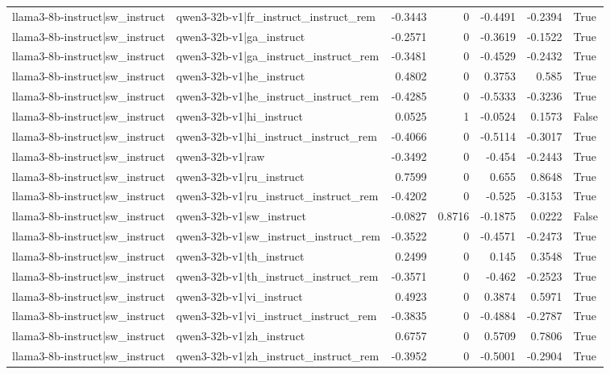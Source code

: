 \begin{table}
\begin{tabular}{l l r r r r l}
llama3-8b-instruct|sw_instruct & qwen3-32b-v1|fr_instruct_instruct_rem & -0.3443 & 0 & -0.4491 & -0.2394 & True \\
llama3-8b-instruct|sw_instruct & qwen3-32b-v1|ga_instruct & -0.2571 & 0 & -0.3619 & -0.1522 & True \\
llama3-8b-instruct|sw_instruct & qwen3-32b-v1|ga_instruct_instruct_rem & -0.3481 & 0 & -0.4529 & -0.2432 & True \\
llama3-8b-instruct|sw_instruct & qwen3-32b-v1|he_instruct & 0.4802 & 0 & 0.3753 & 0.585 & True \\
llama3-8b-instruct|sw_instruct & qwen3-32b-v1|he_instruct_instruct_rem & -0.4285 & 0 & -0.5333 & -0.3236 & True \\
llama3-8b-instruct|sw_instruct & qwen3-32b-v1|hi_instruct & 0.0525 & 1 & -0.0524 & 0.1573 & False \\
llama3-8b-instruct|sw_instruct & qwen3-32b-v1|hi_instruct_instruct_rem & -0.4066 & 0 & -0.5114 & -0.3017 & True \\
llama3-8b-instruct|sw_instruct & qwen3-32b-v1|raw & -0.3492 & 0 & -0.454 & -0.2443 & True \\
llama3-8b-instruct|sw_instruct & qwen3-32b-v1|ru_instruct & 0.7599 & 0 & 0.655 & 0.8648 & True \\
llama3-8b-instruct|sw_instruct & qwen3-32b-v1|ru_instruct_instruct_rem & -0.4202 & 0 & -0.525 & -0.3153 & True \\
llama3-8b-instruct|sw_instruct & qwen3-32b-v1|sw_instruct & -0.0827 & 0.8716 & -0.1875 & 0.0222 & False \\
llama3-8b-instruct|sw_instruct & qwen3-32b-v1|sw_instruct_instruct_rem & -0.3522 & 0 & -0.4571 & -0.2473 & True \\
llama3-8b-instruct|sw_instruct & qwen3-32b-v1|th_instruct & 0.2499 & 0 & 0.145 & 0.3548 & True \\
llama3-8b-instruct|sw_instruct & qwen3-32b-v1|th_instruct_instruct_rem & -0.3571 & 0 & -0.462 & -0.2523 & True \\
llama3-8b-instruct|sw_instruct & qwen3-32b-v1|vi_instruct & 0.4923 & 0 & 0.3874 & 0.5971 & True \\
llama3-8b-instruct|sw_instruct & qwen3-32b-v1|vi_instruct_instruct_rem & -0.3835 & 0 & -0.4884 & -0.2787 & True \\
llama3-8b-instruct|sw_instruct & qwen3-32b-v1|zh_instruct & 0.6757 & 0 & 0.5709 & 0.7806 & True \\
llama3-8b-instruct|sw_instruct & qwen3-32b-v1|zh_instruct_instruct_rem & -0.3952 & 0 & -0.5001 & -0.2904 & True \\

\end{tabular}
\end{table}
